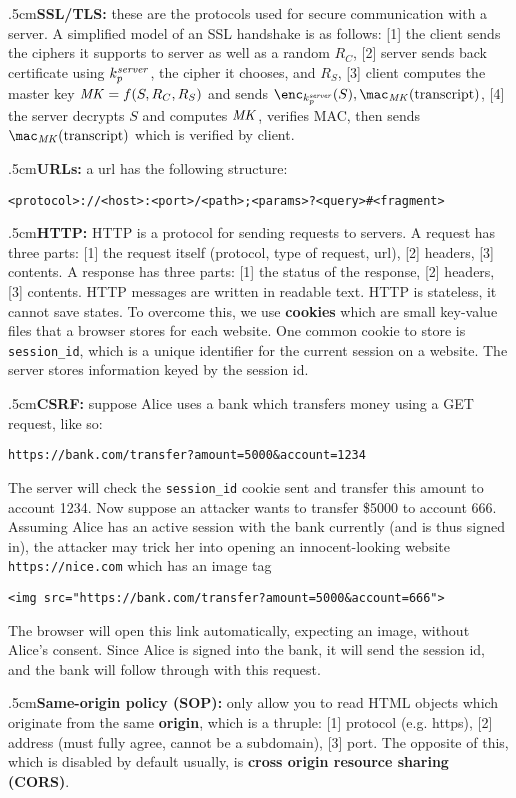 \quitvmode\kern.5cm{\bf SSL/TLS:} these are the protocols used for secure communication with a server.
A simplified model of an SSL handshake is as follows: [1] the client sends the ciphers it supports to server as well as a random $R_C$, [2] server sends back certificate using $k_p^{\it server}$, the cipher
it chooses, and $R_S$, [3] client computes the master key ${\it MK}=f(S,R_C,R_S)$ and sends $\enc_{k_p^{\it server}}(S),\mac_{\it MK}({\rm transcript})$, [4] the server decrypts $S$ and computes ${\it MK}$,
verifies MAC, then sends $\mac_{\it MK}({\rm transcript})$ which is verified by client.

\quitvmode\kern.5cm{\bf URLs:} a url has the following structure:

\centerline{\tt <protocol>://<host>:<port>/<path>;<params>?<query>\#<fragment>}

\quitvmode\kern.5cm{\bf HTTP:} HTTP is a protocol for sending requests to servers.
A request has three parts: [1] the request itself (protocol, type of request, url), [2] headers, [3] contents.
A response has three parts: [1] the status of the response, [2] headers, [3] contents.
HTTP messages are written in readable text.
HTTP is stateless, it cannot save states.
To overcome this, we use {\bf cookies} which are small key-value files that a browser stores for each website.
One common cookie to store is {\tt session\_id}, which is a unique identifier for the current session on a website.
The server stores information keyed by the session id.

\quitvmode\kern.5cm{\bf CSRF:} suppose Alice uses a bank which transfers money using a GET request, like so:

\centerline{\tt https://bank.com/transfer?amount=5000\&account=1234}
The server will check the {\tt session\_id} cookie sent and transfer this amount to account 1234.
Now suppose an attacker wants to transfer \$5000 to account 666.
Assuming Alice has an active session with the bank currently (and is thus signed in), the attacker may trick her into opening an innocent-looking website {\tt https://nice.com} which has an image tag

\centerline{\tt <img src="https://bank.com/transfer?amount=5000\&account=666">}
The browser will open this link automatically, expecting an image, without Alice's consent.
Since Alice is signed into the bank, it will send the session id, and the bank will follow through with this request.

\quitvmode\kern.5cm{\bf Same-origin policy (SOP):} only allow you to read HTML objects which originate from the same {\bf origin}, which is a thruple: [1] protocol (e.g. https), [2] address (must fully
agree, cannot be a subdomain), [3] port.
The opposite of this, which is disabled by default usually, is {\bf cross origin resource sharing (CORS)}.


